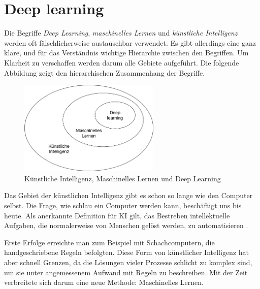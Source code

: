 \section{Deep learning}
Die Begriffe \textit{Deep Learning}, \textit{maschinelles Lernen} und \textit{künstliche Intelligenz} werden oft fälschlicherweise austauschbar verwendet. Es gibt allerdings eine ganz klare, und für das Verständnis wichtige Hierarchie zwischen den Begriffen. Um Klarheit zu verschaffen werden darum alle Gebiete aufgeführt. Die folgende Abbildung zeigt den hierarchischen Zusammenhang der Begriffe.

\begin{figure}[hbt]
	\centering
		\includegraphics[width=0.6\textwidth]{assets/hierarchy.png}
	\caption{Künstliche Intelligenz, Maschinelles Lernen und Deep Learning}
	\label{img:hierarchy}
\end{figure}

Das Gebiet der künstlichen Intelligenz gibt es schon so lange wie den Computer selbst. Die Frage, wie schlau ein Computer werden kann, beschäftigt uns bis heute. Als anerkannte Definition für KI gilt, das Bestreben intellektuelle Aufgaben, die normalerweise von Menschen gelöst werden, zu automatisieren \parencite[][Kap. 1.1.1]{chollet}.

Erste Erfolge erreichte man zum Beispiel mit Schachcomputern, die handgeschriebene Regeln befolgten. Diese Form von künstlicher Intelligenz hat aber schnell Grenzen, da die Lösungen vieler Prozesse schlicht zu komplex sind, um sie unter angemessenem Aufwand mit Regeln zu beschreiben. Mit der Zeit verbreitete sich darum eine neue Methode: Maschinelles Lernen. \parencite[vgl. ][Kap. 1.1.1]{chollet}

